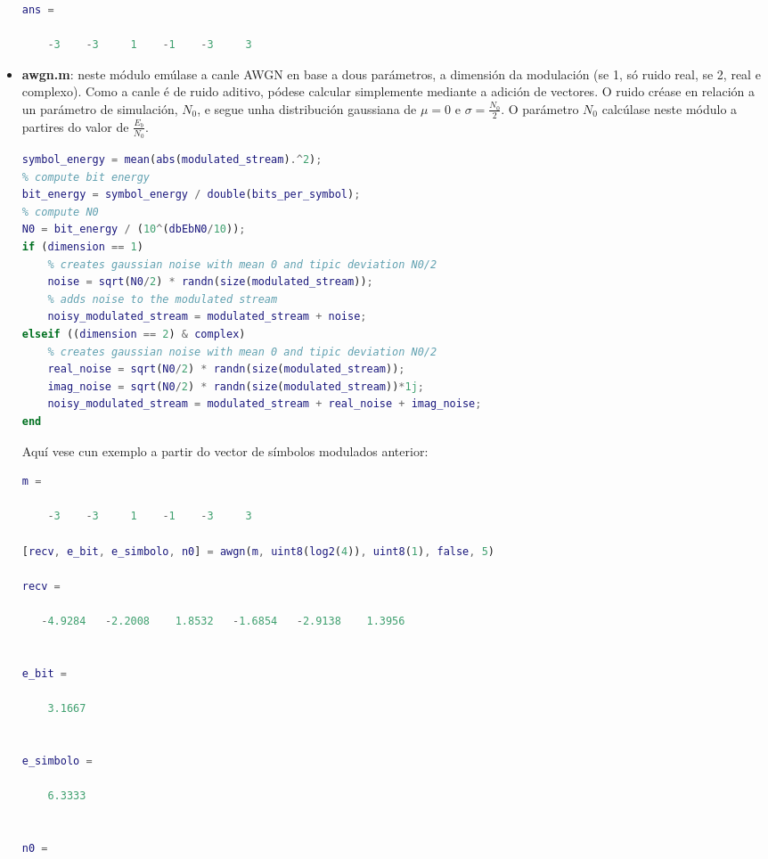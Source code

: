 \documentclass[
	10pt, %
	spanish, %
]{fphw}
\begin{document}
\begin{itemize}
\begin{lstlisting}[language=matlab]
ans =

    -3    -3     1    -1    -3     3
\end{lstlisting}
\item \textbf{awgn.m}: neste módulo emúlase a canle AWGN en base a dous parámetros, a dimensión da modulación (se 1, só ruido real, se 2, real e complexo). Como a canle é de ruido aditivo, pódese calcular simplemente mediante a adición de vectores. O ruido créase en relación a un parámetro de simulación, $N_0$, e segue unha distribución gaussiana de $\mu = 0$ e $\sigma = \frac{N_0}{2}$.
O parámetro $N_0$ calcúlase neste módulo a partires do valor de $\frac{E_b}{N_0}$.
\begin{lstlisting}[language=matlab]
% compute symbol energy
symbol_energy = mean(abs(modulated_stream).^2);
% compute bit energy
bit_energy = symbol_energy / double(bits_per_symbol);
% compute N0
N0 = bit_energy / (10^(dbEbN0/10));
if (dimension == 1)
	% creates gaussian noise with mean 0 and tipic deviation N0/2
	noise = sqrt(N0/2) * randn(size(modulated_stream));
	% adds noise to the modulated stream
	noisy_modulated_stream = modulated_stream + noise;
elseif ((dimension == 2) & complex)
	% creates gaussian noise with mean 0 and tipic deviation N0/2
	real_noise = sqrt(N0/2) * randn(size(modulated_stream));
	imag_noise = sqrt(N0/2) * randn(size(modulated_stream))*1j;
	noisy_modulated_stream = modulated_stream + real_noise + imag_noise;
end
\end{lstlisting}
Aquí vese cun exemplo a partir do vector de símbolos modulados anterior:
\begin{lstlisting}[language=matlab]
m =

    -3    -3     1    -1    -3     3

[recv, e_bit, e_simbolo, n0] = awgn(m, uint8(log2(4)), uint8(1), false, 5)

recv =

   -4.9284   -2.2008    1.8532   -1.6854   -2.9138    1.3956


e_bit =

    3.1667


e_simbolo =

    6.3333


n0 =


\end{lstlisting}
\end{itemize}
\end{document}
